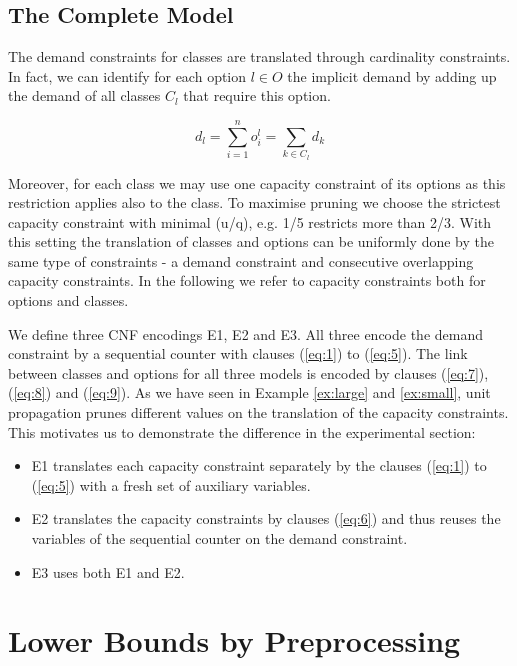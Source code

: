 \documentclass[]{llncs}
\begin{document}
\subsection{The Complete Model}
\label{sub:complete}


The demand constraints for classes are translated through cardinality constraints.  In fact, we can identify for each
option $l \in O$ the implicit demand by adding up the demand of all classes $C_l$ that require this option.

$$ d_l = \sum_{i=1}^n o^l_i = \sum_{k\in C_l} d_k$$                                                 

Moreover, for each class we may use one capacity constraint of its options as this restriction applies also to the
class. To maximise pruning we choose the strictest capacity constraint with minimal (u/q), e.g. 1/5 restricts more than
2/3. With this setting the translation of classes and options can be uniformly done by the same type of constraints - a
demand constraint and consecutive overlapping capacity constraints. In the following we refer to capacity constraints
both for options and classes. 
 
We define three CNF encodings E1, E2 and E3. All three encode the demand constraint by a sequential counter with clauses
(\ref{eq:1}) to (\ref{eq:5}).  The link between classes and options for all three models is encoded by clauses
(\ref{eq:7}),(\ref{eq:8}) and (\ref{eq:9}). As we have seen in Example \ref{ex:large} and \ref{ex:small}, unit
propagation prunes different values on the translation of the capacity constraints. This motivates us to demonstrate the
difference in the experimental section: 

\begin{itemize}
    \item E1 translates each capacity constraint separately by the clauses (\ref{eq:1}) to (\ref{eq:5}) with a fresh set
        of auxiliary variables. 
    \item E2 translates the capacity constraints by clauses (\ref{eq:6}) and thus reuses the variables of the
        sequential counter on the demand constraint. 
    \item E3 uses both E1 and E2. 
\end{itemize}


\section{Lower Bounds by Preprocessing}
\label{sec:lower}
\end{document}
